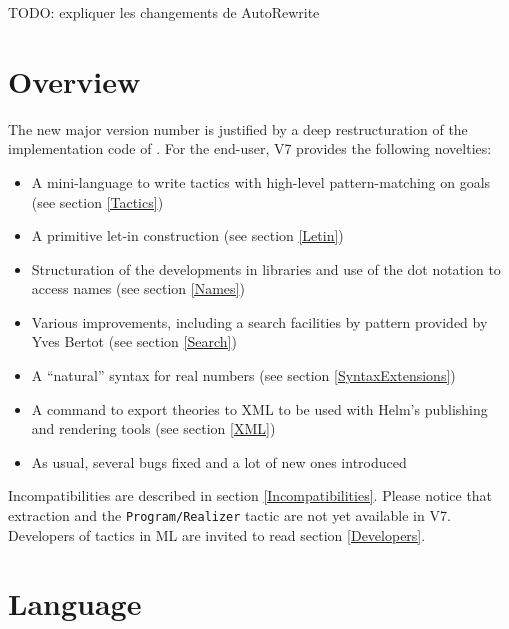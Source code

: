 \documentclass[11pt]{article}
\begin{document}


TODO: expliquer les changements de AutoRewrite

\section*{Overview}

The new major version number is justified by a deep restructuration of
the implementation code of \Coq. For the end-user, {\Coq}
V7 provides the following novelties:

\begin{itemize}
\item A mini-language to write tactics with high-level
pattern-matching on goals  (see section \ref{Tactics})

\item A primitive let-in construction (see section \ref{Letin})
\item Structuration of the developments in libraries and use of the
dot notation to access names (see section \ref{Names})
\item Various improvements, including a search facilities by pattern
provided by Yves Bertot (see section \ref{Search})
\item A ``natural'' syntax for real numbers (see section
\ref{SyntaxExtensions}) 
\item A command to export theories to XML to
be used with Helm's publishing and rendering tools (see section \ref{XML})
\item As usual, several bugs fixed and a lot of new ones introduced
\end{itemize}

Incompatibilities are described in section
\ref{Incompatibilities}. Please notice that extraction and the
{\tt Program/Realizer} tactic are not yet available in {\Coq} V7.
Developers of tactics in ML are invited to read section
\ref{Developers}.

\section{Language}
\end{document}
